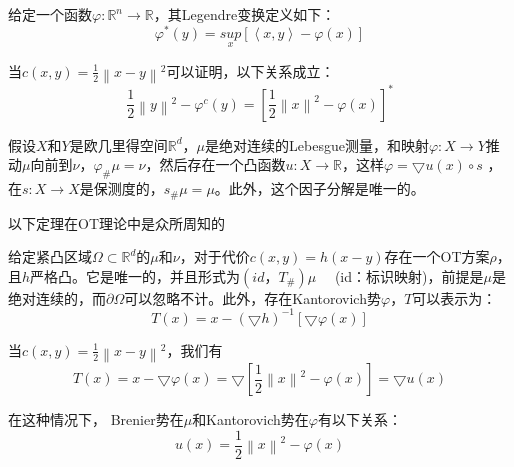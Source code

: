 \begin{definition}[Legendre变换]
	给定一个函数$\varphi : \mathbb{R}^n \to \mathbb{R}$，其Legendre变换定义如下：
	\begin{equation}
		\varphi ^*(y)=\underset{x}{sup}\left [ \left \langle x,y \right \rangle -\varphi (x) \right ]  
		\label{function:14}
	\end{equation}

	当$c(x,y)=\frac{1}{2} \left \| x-y \right \| ^2 $可以证明，以下关系成立：
	\begin{equation}
		\frac{1}{2}\left \| y \right \|^2-\varphi ^c (y)=\left [ \frac{1}{2} \left \| x \right \| ^2-\varphi (x) \right ]^*  
		\label{function:15}
	\end{equation}
	\label{definition:3.4}
\end{definition}

\begin{theorem}[Briener极性因子分解【44】]
	假设$X$和$Y$是欧几里得空间$\mathbb{R}^d$，$\mu$是绝对连续的Lebesgue测量，和映射$\varphi : X\to Y$推动$\mu$向前到$\nu$，$\varphi _{\#}\mu=\nu$，然后存在一个凸函数$u: X \to \mathbb{R}$，这样$\varphi=\bigtriangledown u(x)\circ s $ ，在$s: X \to X$是保测度的，$s_{\#}\mu=\mu$。此外，这个因子分解是唯一的。
	\label{theorem:3.2}
\end{theorem}

以下定理在OT理论中是众所周知的
\begin{theorem}[Villani【44】]
	给定紧凸区域$\Omega \subset \mathbb{R}^d$的$\mu$和$\nu$，对于代价$c(x,y)=h(x-y)$存在一个OT方案$\rho$，且$h$严格凸。它是唯一的，并且形式为$(id，T_{\#})\mu \quad$ (id：标识映射)，前提是$\mu$是绝对连续的，而$\partial \Omega$可以忽略不计。此外，存在Kantorovich势$\varphi$，$T$可以表示为：
	\begin{equation*}
		T(x)=x-(\bigtriangledown h)^{-1} \left [ \bigtriangledown \varphi (x) \right ] 
	\end{equation*}

	当$c(x,y)=\frac{1}{2} \left \| x-y \right \|^2 $，我们有
	\begin{equation*}
		T(x)=x- \bigtriangledown \varphi (x)= \bigtriangledown \left [ \frac{1}{2} \left \| x \right \| ^2 - \varphi(x) \right ] =  \bigtriangledown u(x)
	\end{equation*}

	在这种情况下， Brenier势在$\mu$和Kantorovich势在$\varphi$有以下关系：
	\begin{equation}
		u(x)=\frac{1}{2} \left \| x \right \| ^2 -\varphi (x)
		\label{function:16}
	\end{equation}
	\label{theorem:3.3}
\end{theorem}


